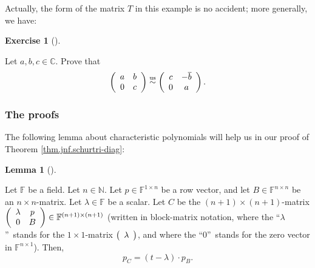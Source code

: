 \documentclass[numbers=enddot,12pt,final,onecolumn,notitlepage]{scrartcl}%
\newcounter{exer}
\numberwithin{exer}{subsection}
\theoremstyle{definition}
\newtheorem{lem}[theo]{Lemma}
\newenvironment{lemma}[1][]
{\begin{lem}[#1]\begin{leftbar}}
{\end{leftbar}\end{lem}}
\newtheorem{exmp}[exer]{Exercise}
\newenvironment{exercise}[1][]
{\begin{exmp}[#1]\begin{leftbar}}
{\end{leftbar}\end{exmp}}
\begin{document}
Actually, the form of the matrix $T$ in this example is no accident; more
generally, we have:

\begin{exercise}
\label{exe.jnf.schurtri-diag.2x2} Let $a,b,c\in\mathbb{C}$. Prove that%
\[
\left(
\begin{array}
[c]{cc}%
a & b\\
0 & c
\end{array}
\right)  \overset{\operatorname*{us}}{\sim}\left(
\begin{array}
[c]{cc}%
c & -\overline{b}\\
0 & a
\end{array}
\right)  .
\]

\end{exercise}

\subsubsection{The proofs}

The following lemma about characteristic polynomials will help us in our proof
of Theorem \ref{thm.jnf.schurtri-diag}:

\begin{lemma}
\label{lem.jnf.schurtri-diag.descend-poly}Let $\mathbb{F}$ be a field. Let
$n\in\mathbb{N}$. Let $p\in\mathbb{F}^{1\times n}$ be a row vector, and let
$B\in\mathbb{F}^{n\times n}$ be an $n\times n$-matrix. Let $\lambda
\in\mathbb{F}$ be a scalar. Let $C$ be the $\left(  n+1\right)  \times\left(
n+1\right)  $-matrix $\left(
\begin{array}
[c]{cc}%
\lambda & p\\
0 & B
\end{array}
\right)  \in\mathbb{F}^{\left(  n+1\right)  \times\left(  n+1\right)  }$
(written in block-matrix notation, where the \textquotedblleft$\lambda
$\textquotedblright\ stands for the $1\times1$-matrix $\left(
\begin{array}
[c]{c}%
\lambda
\end{array}
\right)  $, and where the \textquotedblleft$0$\textquotedblright\ stands for
the zero vector in $\mathbb{F}^{n\times1}$). Then,
\[
p_{C}=\left(  t-\lambda\right)  \cdot p_{B}.
\]

\end{lemma}
\end{document}

